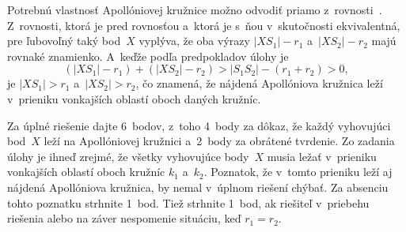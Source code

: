 {\poznamka
Potrebnú vlastnosť Apollóniovej kružnice možno odvodiť priamo z~rovnosti~.
Z~rovnosti, ktorá je pred rovnosťou  a~ktorá je s~ňou v~skutočnosti
ekvivalentná, pre ľubovoľný taký bod~$X$
vyplýva, že oba výrazy $|XS_1|-r_1$ a~$|XS_2|-r_2$ majú rovnaké
znamienko. A~keďže podľa predpokladov úlohy je
$$
(|XS_1|-r_1)+(|XS_2|-r_2)>|S_1S_2|-(r_1+r_2)>0,
$$
je $|XS_1|>r_1$ a~$|XS_2|>r_2$, čo znamená, že nájdená Apollóniova
kružnica leží v~prieniku vonkajších oblastí oboch daných kružníc.


\nobreak\medskip\petit\noindent
Za úplné riešenie dajte 6~bodov, z~toho 4~body za dôkaz, že
každý vyhovujúci bod~$X$ leží na Apollóniovej kružnici a~2~body
za obrátené tvrdenie. Zo zadania úlohy je ihneď zrejmé, že všetky
vyhovujúce body~$X$ musia ležať v~prieniku vonkajších oblastí oboch
kružníc $k_1$ a~$k_2$. Poznatok, že v~tomto prieniku leží aj nájdená
Apollóniova kružnica, by nemal v~úplnom riešení chýbať.
Za absenciu tohto poznatku strhnite 1~bod.
Tiež strhnite 1~bod, ak riešiteľ v~priebehu riešenia alebo
na záver nespomenie situáciu, keď $r_1=r_2$.

\endpetit
\bigbreak
}

